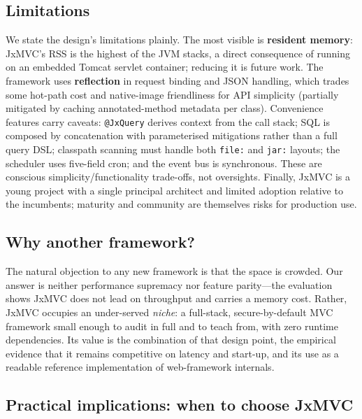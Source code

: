 \subsection{Limitations}

We state the design's limitations plainly. The most visible is
\textbf{resident memory}: JxMVC's RSS is the highest of the JVM stacks,
a direct consequence of running on an embedded Tomcat servlet
container; reducing it is future work. The framework uses
\textbf{reflection} in request binding and JSON handling, which trades
some hot-path cost and native-image friendliness for API simplicity
(partially mitigated by caching annotated-method metadata per class).
Convenience features carry caveats: \texttt{@JxQuery} derives context
from the call stack; SQL is composed by concatenation with
parameterised mitigations rather than a full query DSL; classpath
scanning must handle both \texttt{file:} and \texttt{jar:} layouts; the
scheduler uses five-field cron; and the event bus is synchronous. These
are conscious simplicity/functionality trade-offs, not oversights.
Finally, JxMVC is a young project with a single principal architect and
limited adoption relative to the incumbents; maturity and community are
themselves risks for production use.

\subsection{Why another framework?}

The natural objection to any new framework is that the space is
crowded. Our answer is neither performance supremacy nor feature
parity---the evaluation shows JxMVC does not lead on throughput and
carries a memory cost. Rather, JxMVC occupies an under-served
\emph{niche}: a full-stack, secure-by-default MVC framework small
enough to audit in full and to teach from, with zero runtime
dependencies. Its value is the combination of that design point, the
empirical evidence that it remains competitive on latency and start-up,
and its use as a readable reference implementation of web-framework
internals.

\subsection{Practical implications: when to choose JxMVC}

